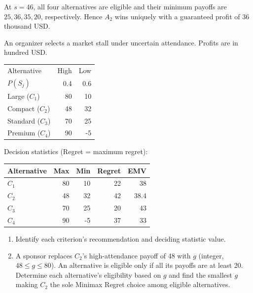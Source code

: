 At $s=46$, all four alternatives are eligible and their minimum
payoffs are $25,36,35,20$, respectively. Hence $A_2$ wins uniquely
with a guaranteed profit of 36 thousand USD.
\secInicio[sec:q1]



An organizer selects a market stall under uncertain attendance. Profits are in hundred USD.

\begin{center}\small\setlength{\tabcolsep}{4pt}
	\begin{tabular}{lrr}\toprule
		Alternative & High & Low\\
		$P(S_j)$ & 0.4 & 0.6\\ \midrule
		Large ($C_1$) & 80 & 10\\
		Compact ($C_2$) & 48 & 32\\
		Standard ($C_3$) & 70 & 25\\
		Premium ($C_4$) & 90 & -5\\
		\bottomrule
	\end{tabular}
\end{center} \vspace{-3mm}

Decision statistics (Regret = maximum regret):

\begin{center}\small\setlength{\tabcolsep}{4pt}
	\begin{tabular}{lrrrr}\toprule
		Alternative & Max & Min & Regret & EMV\\ \midrule
		$C_1$ & 80 & 10 & 22 & 38\\
		$C_2$ & 48 & 32 & 42 & 38.4\\
		$C_3$ & 70 & 25 & 20 & 43\\
		$C_4$ & 90 & -5 & 37 & 33\\
		\bottomrule
	\end{tabular}
\end{center}

\begin{enumerate}[label=\textbf{(\alph*)},leftmargin=*]
	\item Identify each criterion's recommendation and deciding statistic value. 

	\item A sponsor replaces $C_2$'s high-attendance payoff of 48 with $g$ (integer, $48\leq g\leq80$). An alternative is eligible only if all its payoffs are at least 20. Determine each alternative's eligibility based on $g$ and find the smallest $g$ making $C_2$ the sole Minimax Regret choice among eligible alternatives. 
\end{enumerate}
\label{sol:q2a}
